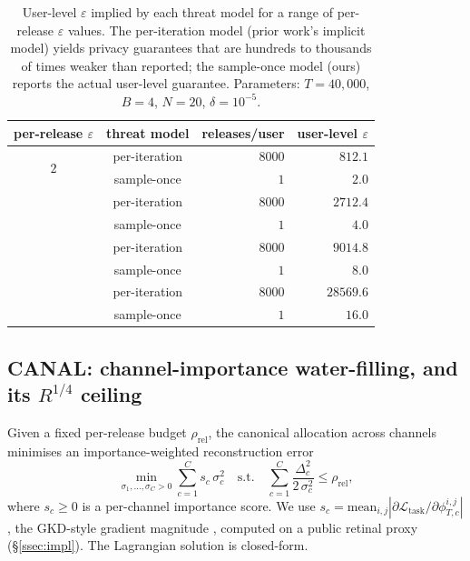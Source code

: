 \begin{table}[t]
\centering
\small
\caption{User-level $\varepsilon$ implied by each threat model for a
range of per-release $\varepsilon$ values. The per-iteration model
(prior work's implicit model) yields privacy guarantees that are
hundreds to thousands of times weaker than reported; the sample-once
model (ours) reports the actual user-level guarantee.
Parameters: $T{=}40{,}000$, $B{=}4$, $N{=}20$, $\delta{=}10^{-5}$.}
\label{tab:privacy}
\begin{tabular}{c c r r}
\toprule
per-release $\varepsilon$ & threat model & releases/user & user-level $\varepsilon$ \\
\midrule
\multirow{2}{*}{$2$}  & per-iteration & $8000$ & $812.1$ \\
                      & sample-once   & $1$    & $2.0$   \\
\addlinespace[2pt]
\multirow{2}{*}{$4$}  & per-iteration & $8000$ & $2712.4$ \\
                      & sample-once   & $1$    & $4.0$    \\
\addlinespace[2pt]
\multirow{2}{*}{$8$}  & per-iteration & $8000$ & $9014.8$ \\
                      & sample-once   & $1$    & $8.0$    \\
\addlinespace[2pt]
\multirow{2}{*}{$16$} & per-iteration & $8000$ & $28569.6$ \\
                      & sample-once   & $1$    & $16.0$    \\
\bottomrule
\end{tabular}
\end{table}

\subsection{CANAL: channel-importance water-filling, and its $R^{1/4}$ ceiling}
\label{ssec:wf}

Given a fixed per-release budget $\rho_{\mathrm{rel}}$, the canonical
allocation across channels minimises an importance-weighted
reconstruction error
\begin{equation}
\min_{\sigma_1,\ldots,\sigma_C > 0}
\sum_{c=1}^C s_c\,\sigma_c^{2}
\quad\text{s.t.}\quad
\sum_{c=1}^C\frac{\Delta_c^{2}}{2\,\sigma_c^{2}} \le \rho_{\mathrm{rel}},
\label{eq:opt}
\end{equation}
where $s_c \ge 0$ is a per-channel importance score. We use
$s_c = \mathrm{mean}_{i,j} |\partial\mathcal{L}_{\mathrm{task}}/\partial \phi_{T,c}^{i,j}|$,
the GKD-style gradient magnitude \cite{lan2024gkd}, computed on a
public retinal proxy (\S\ref{ssec:impl}). The Lagrangian solution is
closed-form.

